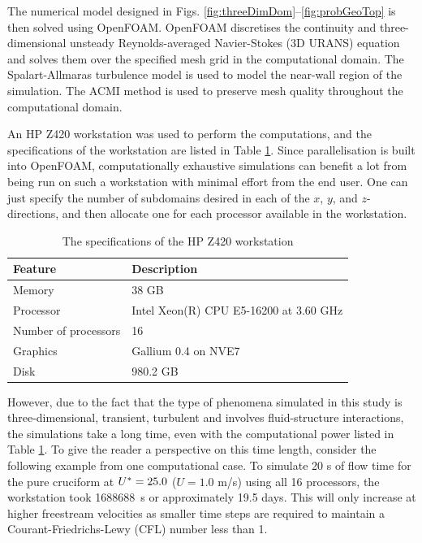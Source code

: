 \documentclass[oneside]{utmthesis}
\begin{document}
The numerical model designed in Figs. \ref{fig:threeDimDom}--\ref{fig:probGeoTop} is then solved using OpenFOAM. OpenFOAM discretises the continuity and three-dimensional unsteady Reynolds-averaged Navier-Stokes (3D URANS) equation and solves them over the specified mesh grid in the computational domain. The Spalart-Allmaras turbulence model is used to model the near-wall region of the simulation. The ACMI method is used to preserve mesh quality throughout the computational domain.

An HP Z420 workstation was used to perform the computations, and the specifications of the workstation are listed in Table \ref{tab:workstationSpec}. Since parallelisation is built into OpenFOAM, computationally exhaustive simulations can benefit a lot from being run on such a workstation with minimal effort from the end user. One can just specify the number of subdomains desired in each of the $x$, $y$, and $z$-directions, and then allocate one for each processor available in the workstation.

\begin{table}[!ht]
\centering
\caption{The specifications of the HP Z420 workstation} \label{tab:workstationSpec}
\vspace{\baselineskip}
\begin{tabular}{l l}
  \hline
  \hline

  Feature               & Description                            \\
  \hline

  Memory                & 38 GB                                  \\
  Processor             & Intel Xeon(R) CPU E5-16200 at 3.60 GHz \\
  Number of processors  & 16                                     \\
  Graphics              & Gallium 0.4 on NVE7                    \\
  Disk                  & 980.2 GB                               \\
  \hline
  \hline
\end{tabular}
\end{table}

However, due to the fact that the type of phenomena simulated in this study is three-dimensional, transient, turbulent and involves fluid-structure interactions, the simulations take a long time, even with the computational power listed in Table \ref{tab:workstationSpec}. To give the reader a perspective on this time length, consider the following example from one computational case. To simulate 20 s of flow time for the pure cruciform at $U^{*} = 25.0$ ($U = 1.0$ m/s) using all 16 processors, the workstation took \SI{1688688}{\second} or approximately 19.5 days. This will only increase at higher freestream velocities as smaller time steps are required to maintain a Courant-Friedrichs-Lewy (CFL) number less than 1.
\end{document}
